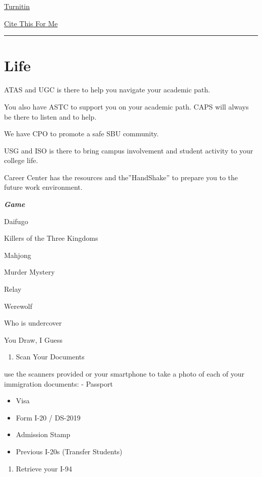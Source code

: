 \documentclass[
]{book}
\providecommand{\tightlist}{%
  \setlength{\itemsep}{0pt}\setlength{\parskip}{0pt}}
\begin{document}
\href{https://www.turnitin.com/}{Turnitin}

\href{https://www.citethisforme.com/}{Cite This For Me}

\begin{center}\rule{0.5\linewidth}{0.5pt}\end{center}

\hypertarget{life}{%
\chapter{Life}\label{life}}

ATAS and UGC is there to help you navigate your academic path.

You also have ASTC to support you on your academic path. CAPS will always be there to listen and to help.

We have CPO to promote a safe SBU community.

USG and ISO is there to bring campus involvement and student activity to your college life.

Career Center has the resources and the''HandShake'' to prepare you to the future work environment.

\textbf{\emph{Game}}

Daifugo

Killers of the Three Kingdoms

Mahjong

Murder Mystery

Relay

Werewolf

Who is undercover

You Draw, I Guess

\begin{enumerate}
\def\labelenumi{\arabic{enumi}.}
\tightlist
\item
  Scan Your Documents
\end{enumerate}

use the scanners provided or your smartphone to take a photo of each of your immigration documents:
- Passport

\begin{itemize}
\item
  Visa
\item
  Form I-20 / DS-2019
\item
  Admission Stamp
\item
  Previous I-20s (Transfer Students)
\end{itemize}

\begin{enumerate}
\def\labelenumi{\arabic{enumi}.}
\setcounter{enumi}{1}
\tightlist
\item
  Retrieve your I-94
\end{enumerate}
\end{document}
